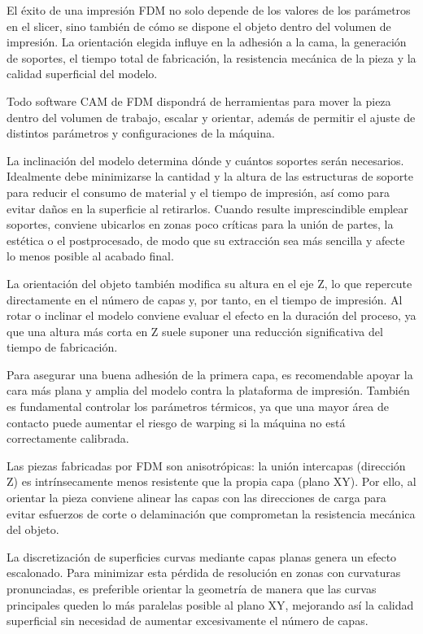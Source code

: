 El éxito de una impresión FDM no solo depende de los valores de los parámetros en el slicer, sino también de cómo se dispone el objeto dentro del volumen de impresión. La orientación elegida influye en la adhesión a la cama, la generación de soportes, el tiempo total de fabricación, la resistencia mecánica de la pieza y la calidad superficial del modelo.

Todo software CAM de FDM dispondrá de herramientas para mover la pieza dentro del volumen de trabajo, escalar y orientar, además de permitir el ajuste de distintos parámetros y configuraciones de la máquina.

La inclinación del modelo determina dónde y cuántos soportes serán necesarios. Idealmente debe minimizarse la cantidad y la altura de las estructuras de soporte para reducir el consumo de material y el tiempo de impresión, así como para evitar daños en la superficie al retirarlos. Cuando resulte imprescindible emplear soportes, conviene ubicarlos en zonas poco críticas para la unión de partes, la estética o el postprocesado, de modo que su extracción sea más sencilla y afecte lo menos posible al acabado final.

La orientación del objeto también modifica su altura en el eje Z, lo que repercute directamente en el número de capas y, por tanto, en el tiempo de impresión. Al rotar o inclinar el modelo conviene evaluar el efecto en la duración del proceso, ya que una altura más corta en Z suele suponer una reducción significativa del tiempo de fabricación.

Para asegurar una buena adhesión de la primera capa, es recomendable apoyar la cara más plana y amplia del modelo contra la plataforma de impresión. También es fundamental controlar los parámetros térmicos, ya que una mayor área de contacto puede aumentar el riesgo de warping si la máquina no está correctamente calibrada.

Las piezas fabricadas por FDM son anisotrópicas: la unión intercapas (dirección Z) es intrínsecamente menos resistente que la propia capa (plano XY). Por ello, al orientar la pieza conviene alinear las capas con las direcciones de carga para evitar esfuerzos de corte o delaminación que comprometan la resistencia mecánica del objeto.

La discretización de superficies curvas mediante capas planas genera un efecto escalonado. Para minimizar esta pérdida de resolución en zonas con curvaturas pronunciadas, es preferible orientar la geometría de manera que las curvas principales queden lo más paralelas posible al plano XY, mejorando así la calidad superficial sin necesidad de aumentar excesivamente el número de capas.

